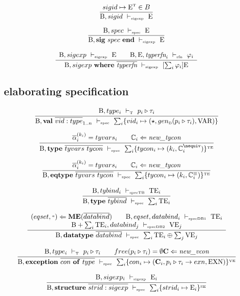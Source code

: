 \documentclass[11pt,a4paper]{article}
\newcommand{\key}[1]{\textrm{\textbf{#1}}}
\newcommand{\sig}       {\key{sig}}
\newcommand{\End}       {\key{end}}
\newcommand{\val}       {\key{val}}
\newcommand{\type}      {\key{type}}
\newcommand{\eqtype}    {\key{eqtype}}
\newcommand{\datatype}  {\key{datatype}}
\newcommand{\exception} {\key{exception}}
\newcommand{\of}        {\key{of}}
\newcommand{\where}     {\key{where}}
\newcommand{\typerfn}   {\textit{typerfn}}
\newcommand{\Structure} {\key{structure}}
\newcommand{\B}  {\textrm{B}}
\newcommand{\sB} {\textrm{\tiny B}}
\newcommand{\E}  {\textrm{E}}
\newcommand{\sT} {\textrm{\tiny T}}
\newcommand{\TE} {\textrm{TE}}
\newcommand{\sTE}{\textrm{\tiny TE}}
\newcommand{\VE} {\textrm{VE}}
\newcommand{\sVE}{\textrm{\tiny VE}}
\newcommand{\sSE}{\textrm{\tiny SE}}
\newcommand{\tycon}{\mathbb{C}}
\newcommand{\vcon} {\mathbf{C}}
\newcommand{\eqyes}{\equiv}
\newcommand{\eqnot}{\nequiv}
\newcommand{\VKE}  {\textrm{EXN}}
\newcommand{\VKV}  {\textrm{VAR}}
\newcommand{\corenew}[1]{\textit{new\_#1}}
\newcommand{\vdashSigexp}  {\ \vdash_{\textrm{\tiny sigexp}}\ }
\newcommand{\vdashSpec}    {\ \vdash_{\textrm{\tiny spec}}\ }
\newcommand{\vdashSpecTB}  {\ \vdash_{\textrm{\tiny specTB}}\ }
\newcommand{\vdashSpecDBA} {\ \vdash_{\textrm{\tiny specDB1}}\ }
\newcommand{\vdashSpecDBB} {\ \vdash_{\textrm{\tiny specDB2}}\ }
\newcommand{\vdashTyperfn} {\ \vdash_{\textrm{\tiny rfn}}\ }
\newcommand{\vdashT}       {\ \vdash_{\textrm{\tiny T}}\ }
\newcommand{\braced}[1]{\{#1\}}
\newcommand{\qualtype}[2]{#1 \triangleright #2}
\newcommand{\MaximizeEq}{\key{ME}}
\newcommand{\wildcard}{{\color{gray}\scriptstyle\textbf{*}}}
\newcommand{\absval}{\star}
\begin{document}
\[
\frac
 { sigid \mapsto \E^{\sT} \in B }
 {\B, sigid \vdashSigexp \E}
\]

\[
\frac
 {\B, spec \vdashSpec \E}
 {\B, \sig\ spec\ \End \vdashSigexp \E}
\]

\[
\frac
 {\begin{array}{c}
  \B, sigexp \vdashSigexp \E \qquad
  \B, \E, \typerfn_i \vdashTyperfn \varphi_i
  \end{array}}
 {\B, sigexp\ \where\ \overline{\typerfn} \vdashSigexp [\sum_i \varphi_i]\E}
\]

\subsection{elaborating specification}
\[
\cfrac
 {\B, type_i \vdashT \qualtype{p_i}{\tau_i}}
 {\B, \val\ \overline{vid:type}_{1..n} \vdashSpec \sum_i \braced{vid_i \mapsto (\absval, gen_\sB(\qualtype{p_i}{\tau_i}), \VKV)}}
\]

\[
\cfrac
 {\overline{\alpha}_i^{(k_i)} = tyvars_i \qquad
  \tycon_i \Leftarrow \corenew{tycon}}
 {\B, \type\ \overline{tyvars\ tycon} \vdashSpec \sum_i \braced{tycon_i \mapsto (k_i, \tycon_i^\eqnot)}^\sTE}
\]

\[
\cfrac
 {\overline{\alpha}_i^{(k_i)} = tyvars_i \qquad
  \tycon_i \Leftarrow \corenew{tycon}}
 {\B, \eqtype\ \overline{tyvars\ tycon} \vdashSpec \sum_i \braced{tycon_i \mapsto (k_i, \tycon_i^\eqyes)}^\sTE}
\]

\[
\cfrac
 {\B, tybind_i \vdashSpecTB \TE_i}
 {\B, \type\ \overline{tybind} \vdashSpec \sum_i \TE_i}
\]

\[
\cfrac
 {\begin{array}{c}
  (eqset,\wildcard) \Leftarrow \MaximizeEq(\overline{databind}) \qquad
  \B, eqset, databind_i \vdashSpecDBA \TE_i             \\
  \B + \sum_i \TE_i, databind_j \vdashSpecDBB \VE_j
  \end{array}}
 {\B, \datatype\ \overline{databind} \vdashSpec \sum_i \TE_i \oplus \sum_j \VE_j}
\]

\[
\cfrac
 {\B, type_i \vdashT \qualtype{p_i}{\tau_i} \qquad
  free(\qualtype{p_i}{\tau_i}) = \emptyset
  \vcon\Leftarrow\corenew{vcon}}
 {\B, \exception\ \overline{con\ \of\ type} \vdashSpec
    \sum_i \braced{con_i \mapsto (\vcon_i, \qualtype{p_i}{\tau_i\to exn}, \VKE)}^\sVE}
\]

\[
\cfrac
 {\B, sigexp_i \vdashSigexp \E_i}
 {\B, \Structure\ \overline{strid:sigexp} \vdashSpec
   \sum_i \braced{strid_i \mapsto \E_i}^\sSE }
\]
\end{document}

